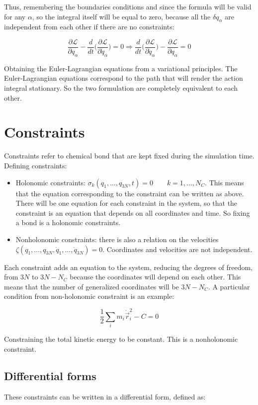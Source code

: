 	Thus, remembering the boundaries conditions and since the formula will be valid for any $\alpha$, so the integral itself will be equal to zero, because all the $\delta q_\alpha$ are independent from each other if there are no constraints:

	$$\frac{\partial\mathcal{L}}{\partial q_\alpha} - \frac{d}{dt}\biggl(\frac{\partial\mathcal{L}}{\partial\dot{q}_\alpha}\biggr) = 0\Rightarrow \frac{d}{dt}\biggl(\frac{\partial\mathcal{L}}{\partial\dot{q}_\alpha}\biggr)-\frac{\partial\mathcal{L}}{\partial q_\alpha} = 0$$

	Obtaining the Euler-Lagrangian equations from a variational principles.
	The Euler-Lagrangian equations correspond to the path that will render the action integral stationary.
	So the two formulation are completely equivalent to each other.

\section{Constraints}
Constraints refer to chemical bond that are kept fixed during the simulation time.
Defining constraints:

\begin{itemize}
	\item Holonomic constraints: $\sigma_k(q_1, \dots, q_{3N}, t) = 0\qquad k = 1, \dots, N_C$.
		This means that the equation corresponding to the constraint can be written as above.
		There will be one equation for each constraint in the system, so that the constraint is an equation that depends on all coordinates and time.
		So fixing a bond is a holonomic constraints.
	\item Nonholonomic constraints: there is also a relation on the velocities $\zeta(q_1, \dots, q_{3N}, \dot{q}_1, \dots, \dot{q}_{3N}) = 0$.
		Coordinates and velocities are not independent.
\end{itemize}

Each constraint adds an equation to the system, reducing the degrees of freedom, from $3N$ to $3N-N_C$ because the coordinates will depend on each other.
This means that the number of generalized coordinates will be $3N-N_C$.
A particular condition from non-holonomic constraint is an example:

$$\frac{1}{2}\sum\limits_{i}m_i\dot{\vec{r}}_i^2-C = 0$$

Constraining the total kinetic energy to be constant.
This is a nonholonomic constraint.

	\subsection{Differential forms}
	These constraints can be written in a differential form, defined as:

